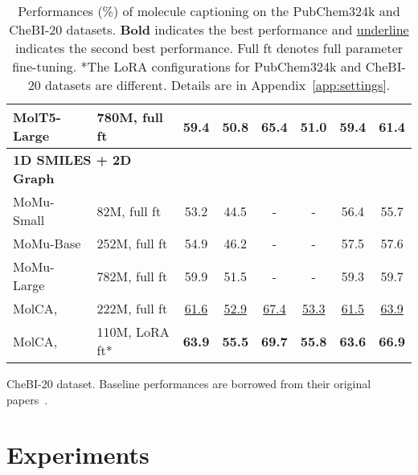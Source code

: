 \documentclass[11pt]{article}
\begin{document}
\begin{table*}[t]
\begin{subtable}[t]{\textwidth}
\begin{tabular}{llcccccc}
    MolT5-Large            & 780M, full ft                     & 59.4                 & 50.8                 & 65.4                 & 51.0                 & 59.4                 & 61.4                 \\\midrule
    \multicolumn{2}{l}{\textbf{1D SMILES + 2D Graph}} & \multicolumn{1}{l}{} & \multicolumn{1}{l}{} & \multicolumn{1}{l}{} & \multicolumn{1}{l}{} & \multicolumn{1}{l}{} & \multicolumn{1}{l}{} \\
    MoMu-Small             & 82M, full ft                      & 53.2                 & 44.5                 & -                    & -                    & 56.4                 & 55.7                 \\
    MoMu-Base              & 252M, full ft                     & 54.9                 & 46.2                 & -                    & -                    & 57.5                 & 57.6                 \\
    MoMu-Large             & 782M, full ft                     & 59.9                 & 51.5                 & -                    & -                    & 59.3                 & 59.7                 \\
    MolCA,  & 222M, full ft & \underline{61.6}          & \underline{52.9}          & \underline{67.4}          & \underline{53.3}          & \underline{61.5}          & \underline{63.9}          \\
    MolCA,               & 110M, LoRA ft*              & \textbf{63.9}        & \textbf{55.5}        & \textbf{69.7}        & \textbf{55.8}        & \textbf{63.6}        & \textbf{66.9}       \\\bottomrule
    \end{tabular} 
    \caption{CheBI-20 dataset. Baseline performances are borrowed from their original papers~\citep{MolT5, MoMu}.}
    \label{tab:chebi20_cap}
\end{subtable}
\caption{Performances (\%) of molecule captioning on the PubChem324k and CheBI-20 datasets. \textbf{Bold} indicates the best performance and \underline{underline} indicates the second best performance. Full ft denotes full parameter fine-tuning. *The LoRA configurations for PubChem324k and CheBI-20 datasets are different. Details are in Appendix~\ref{app:settings}.}
 \vspace{-4mm}
\label{tab:cap}
\end{table*}

\section{Experiments}
\end{document}
